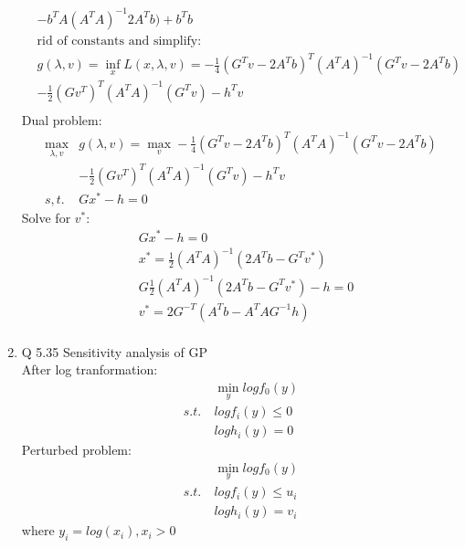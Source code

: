 \documentclass[12pt,letter]{article}
\begin{document}
\begin{enumerate}
\begin{align*}
    &- b^TA(A^TA)^{-1}2A^Tb) + b^Tb\\
    &\text{rid of constants and simplify}:\\
    &g(\lambda,v)= \inf_x L(x,\lambda,v) = -\frac{1}{4}(G^Tv-2A^Tb)^T(A^TA)^{-1}(G^Tv-2A^Tb) \\
    &-\frac{1}{2}(Gv^T)^T(A^TA)^{-1}(G^Tv) -h^Tv\\
  \end{align*}
  Dual problem:
  \begin{align*}
    \max_{\lambda,v} & g(\lambda,v) = \max_v -\frac{1}{4}(G^Tv-2A^Tb)^T(A^TA)^{-1}(G^Tv-2A^Tb) \\
    &-\frac{1}{2}(Gv^T)^T(A^TA)^{-1}(G^Tv) -h^Tv\\
    s,t.\ & Gx^*-h=0
  \end{align*}
  Solve for $v^*$:\\
  \begin{align*}
    &Gx^*-h=0\\
    &x^* = \frac{1}{2}(A^TA)^{-1}(2A^Tb - G^Tv^*)\\
    &G\frac{1}{2}(A^TA)^{-1}(2A^Tb - G^Tv^*)-h=0\\
    &v^*=2G^{-T}(A^Tb-A^TAG^{-1}h)\\
  \end{align*}
  \pagebreak
\item Q 5.35 Sensitivity analysis of GP\\
  After log tranformation:
  \begin{align*}
    &\min_y log f_0(y)\\
    s.t.\ & log f_i(y) \leq 0\\
    & log h_i(y) = 0
  \end{align*}
  Perturbed problem:
  \begin{align*}
    &\min_y log f_0(y)\\
    s.t.\ & log f_i(y) \leq u_i\\
    & log h_i(y) = v_i
  \end{align*}
  where $y_i = log(x_i), x_i > 0$\\
  

\end{enumerate}
\end{document}
